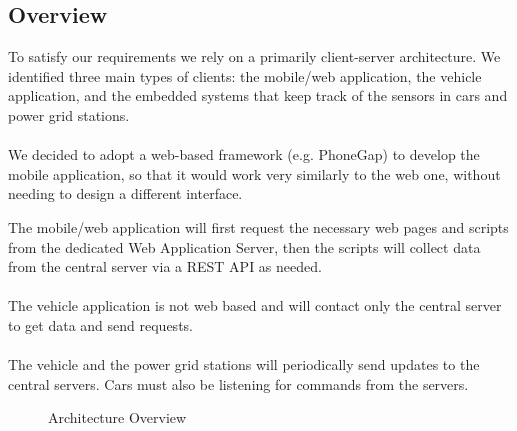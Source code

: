 \documentclass[english]{article}
\begin{document}
\subsection{Overview}

To satisfy our requirements we rely on a primarily client-server architecture. We identified three main types of clients: the mobile/web application, the vehicle application, and the embedded systems that keep track of the sensors in cars and power grid stations.

\paragraph{}
We decided to adopt a web-based framework (e.g. PhoneGap) to develop the mobile application, so that it would work very similarly to the web one, without needing to design a different interface.

The mobile/web application will first request the necessary web pages and scripts from the dedicated Web Application Server, then the scripts will collect data from the central server via a REST API as needed.

\paragraph{}
The vehicle application is not web based and will contact only the central server to get data and send requests.

\paragraph{}
The vehicle and the power grid stations will periodically send updates to the central servers. Cars must also be  listening for commands from the servers.


\begin{figure}[H]
	\centering
	\caption{Architecture Overview}
	\label{architectureoverview}
\end{figure}
\end{document}
